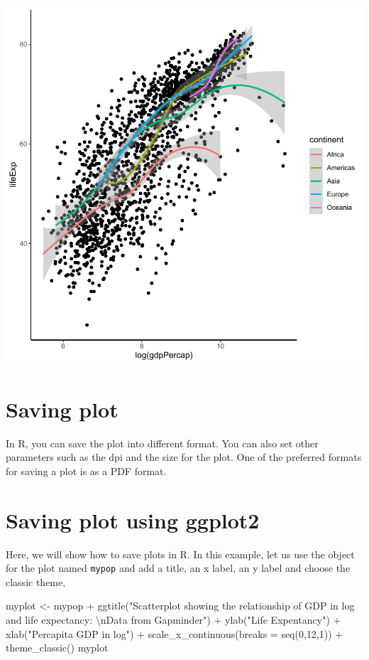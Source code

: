 \documentclass[
]{book}
\makeatletter
\newenvironment{Shaded}{\begin{snugshade}}{\end{snugshade}}
\newcommand{\AttributeTok}[1]{\textcolor[rgb]{0.61,0.61,0.61}{#1}}
\newcommand{\DecValTok}[1]{\textcolor[rgb]{0.06,0.06,0.06}{#1}}
\newcommand{\FunctionTok}[1]{\textcolor[rgb]{0,0,0}{#1}}
\newcommand{\NormalTok}[1]{#1}
\newcommand{\OtherTok}[1]{\textcolor[rgb]{0.37,0.37,0.37}{#1}}
\newcommand{\SpecialCharTok}[1]{\textcolor[rgb]{0,0,0}{#1}}
\newcommand{\StringTok}[1]{\textcolor[rgb]{0.5,0.5,0.5}{#1}}
\newenvironment{kframe}{%
\medskip{}
\setlength{\fboxsep}{.8em}
 \def\at@end@of@kframe{}%
 \ifinner\ifhmode%
  \def\at@end@of@kframe{\end{minipage}}%
  \begin{minipage}{\columnwidth}%
 \fi\fi%
 \def\FrameCommand##1{\hskip\@totalleftmargin \hskip-\fboxsep
 \colorbox{shadecolor}{##1}\hskip-\fboxsep
     \hskip-\linewidth \hskip-\@totalleftmargin \hskip\columnwidth}%
 \MakeFramed {\advance\hsize-\width
   \@totalleftmargin\z@ \linewidth\hsize
   \@setminipage}}%
 {\par\unskip\endMakeFramed%
 \at@end@of@kframe}
\renewenvironment{Shaded}{\begin{kframe}}{\end{kframe}}
\makeatother
\begin{document}
\begin{center}\includegraphics[width=0.7\linewidth,keepaspectratio]{Multivariable_Data_Analysis_files/figure-latex/unnamed-chunk-42-1} \end{center}

\hypertarget{saving-plot}{%
\section{Saving plot}\label{saving-plot}}

In R, you can save the plot into different format. You can also set other parameters such as the dpi and the size for the plot. One of the preferred formats for saving a plot is as a PDF format.

\hypertarget{saving-plot-using-ggplot2}{%
\section{Saving plot using ggplot2}\label{saving-plot-using-ggplot2}}

Here, we will show how to save plots in R. In this example, let us use the object for the plot named \texttt{mypop} and add a title, an x label, an y label and choose the classic theme,

\begin{Shaded}
\begin{Highlighting}[]
\NormalTok{myplot }\OtherTok{\textless{}{-}}\NormalTok{ mypop }\SpecialCharTok{+} 
\FunctionTok{ggtitle}\NormalTok{(}\StringTok{"Scatterplot showing the relationship of GDP in log and life expectancy:}
\StringTok{                }\SpecialCharTok{\textbackslash{}n}\StringTok{Data from Gapminder"}\NormalTok{) }\SpecialCharTok{+} \FunctionTok{ylab}\NormalTok{(}\StringTok{"Life Expentancy"}\NormalTok{) }\SpecialCharTok{+} 
  \FunctionTok{xlab}\NormalTok{(}\StringTok{"Percapita GDP in log"}\NormalTok{) }\SpecialCharTok{+}
  \FunctionTok{scale\_x\_continuous}\NormalTok{(}\AttributeTok{breaks =} \FunctionTok{seq}\NormalTok{(}\DecValTok{0}\NormalTok{,}\DecValTok{12}\NormalTok{,}\DecValTok{1}\NormalTok{)) }\SpecialCharTok{+}
  \FunctionTok{theme\_classic}\NormalTok{()}
\NormalTok{myplot}
\end{Highlighting}
\end{Shaded}
\end{document}
